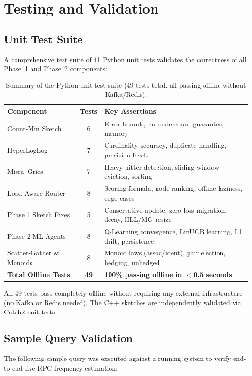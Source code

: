 \section{Testing and Validation}

\subsection{Unit Test Suite}
A comprehensive test suite of 41 Python unit tests validates the correctness of all Phase~1 and Phase~2 components:

\begin{table}[htbp]
\centering
\begin{tabular}{l c l}
\toprule
\textbf{Component} & \textbf{Tests} & \textbf{Key Assertions} \\
\midrule
Count-Min Sketch     & 6  & Error bounds, no-undercount guarantee, memory \\
HyperLogLog          & 7  & Cardinality accuracy, duplicate handling, precision levels \\
Misra--Gries         & 7  & Heavy hitter detection, sliding-window eviction, sorting \\
Load-Aware Router    & 8  & Scoring formula, node ranking, offline laziness, edge cases \\
Phase 1 Sketch Fixes & 5  & Conservative update, zero-loss migration, decay, HLL/MG resize \\
Phase 2 ML Agents    & 8  & Q-Learning convergence, LinUCB learning, L1 drift, persistence \\
Scatter-Gather \& Monoids & 8 & Monoid laws (assoc/ident), pair election, hedging, unhedged \\
\midrule
\textbf{Total Offline Tests} & \textbf{49} & \textbf{100\% passing offline in $<$0.5 seconds} \\
\bottomrule
\end{tabular}
\caption{Summary of the Python unit test suite (49 tests total, all passing offline without Kafka/Redis).}
\label{tab:test_suite}
\end{table}

All 49 tests pass completely offline without requiring any external infrastructure (no Kafka or Redis needed). The C++ sketches are independently validated via Catch2 unit tests.

\subsection{Sample Query Validation}
The following sample query was executed against a running system to verify end-to-end live RPC frequency estimation:


